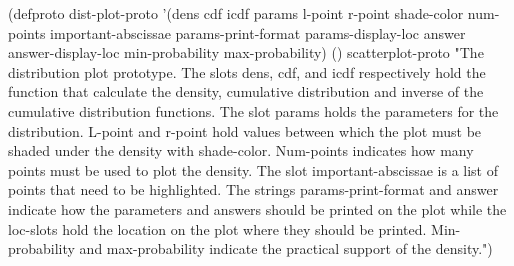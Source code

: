 \nwenddocs{}\endmoddef
(defproto dist-plot-proto 
          '(dens cdf icdf params l-point r-point shade-color
                 num-points important-abscissae
                 params-print-format params-display-loc
                 answer answer-display-loc 
                 min-probability max-probability)
           () scatterplot-proto
"The distribution plot prototype. The slots dens, cdf, and icdf
respectively hold the function that calculate the density, 
cumulative distribution and inverse of the cumulative distribution
functions. The slot params holds the parameters for the 
distribution. L-point and r-point hold values between which the
plot must be shaded under the density with shade-color. Num-points
indicates how many points must be used to plot the density. The slot
important-abscissae is a list of points that need to be highlighted.
The strings params-print-format and answer indicate how
the parameters and answers should be printed on the plot while the
loc-slots hold the location on the plot where they should be 
printed. Min-probability and max-probability indicate the
practical support of the density.")
\eatline
{}\eatline
{}\eatline
{}\eatline
{}\eatline
{}\eatline
